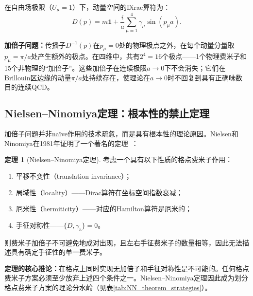 \documentclass[12pt,a4paper]{ctexart}
\theoremstyle{definition}
\newtheorem{theorem}{定理}[section]
\begin{document}
在自由场极限（$U_\mu = 1$）下，动量空间的Dirac算符为：
\begin{equation}
D(p) = m\mathbf{1} + \frac{i}{a}\sum_{\mu=1}^4 \gamma_\mu \sin(p_\mu a).
\label{eq:naive_Dirac_momentum}
\end{equation}

\textbf{加倍子问题：}传播子$D^{-1}(p)$在$p_\mu = 0$处的物理极点之外，在每个动量分量取$p_\mu = \pi/a$处产生额外的极点。在四维中，共有$2^4 = 16$个极点——1个物理费米子和15个非物理的``加倍子''。这些加倍子在连续极限$a\to 0$下不会消失；它们在Brillouin区边缘的动量$\pi/a$处持续存在，使理论在$a\to 0$时不回复到具有正确味数目的连续QCD。

\subsection{Nielsen--Ninomiya定理：根本性的禁止定理}

加倍子问题并非na\"ive作用的技术疏忽，而是具有根本性的理论原因。Nielsen和Ninomiya在1981年证明了一个著名的定理~\cite{NielsenNinomiya1981}：

\begin{theorem}[Nielsen--Ninomiya定理]
考虑一个具有以下性质的格点费米子作用：
\begin{enumerate}[nosep]
    \item 平移不变性（translation invariance）；
    \item 局域性（locality）——Dirac算符在坐标空间指数衰减；
    \item 厄米性（hermiticity）——对应的Hamilton算符是厄米的；
    \item 手征对称性——$\{D, \gamma_5\} = 0$。
\end{enumerate}
则费米子加倍子不可避免地成对出现，且左右手征费米子的数量相等，因此无法描述具有确定手征性的单一费米子。
\end{theorem}

\textbf{定理的核心推论：}在格点上同时实现无加倍子和手征对称性是不可能的。任何格点费米子方案必须至少放弃上述四个条件之一。Nielsen--Ninomiya定理因此成为划分格点费米子方案的理论分水岭（见表\ref{tab:NN_theorem_strategies}）。
\end{document}
